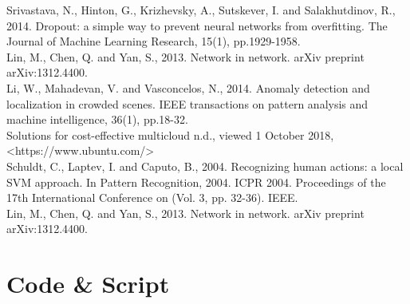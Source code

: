 \newline
[50] Srivastava, N., Hinton, G., Krizhevsky, A., Sutskever, I. and Salakhutdinov, R., 2014. Dropout: a simple way to prevent neural networks from overfitting. The Journal of Machine Learning Research, 15(1), pp.1929-1958.\\
\newline
[51] Lin, M., Chen, Q. and Yan, S., 2013. Network in network. arXiv preprint arXiv:1312.4400.\\
\newline
[52] Li, W., Mahadevan, V. and Vasconcelos, N., 2014. Anomaly detection and localization in crowded scenes. IEEE transactions on pattern analysis and machine intelligence, 36(1), pp.18-32.\\
\newline
[53] Solutions for cost-effective multicloud n.d., viewed 1 October 2018,\\ <https://www.ubuntu.com/> \\
\newline
[54] Schuldt, C., Laptev, I. and Caputo, B., 2004. Recognizing human actions: a local SVM approach. In Pattern Recognition, 2004. ICPR 2004. Proceedings of the 17th International Conference on (Vol. 3, pp. 32-36). IEEE.\\
\newline
[55] Lin, M., Chen, Q. and Yan, S., 2013. Network in network. arXiv preprint arXiv:1312.4400.

\section{Code \& Script}


	

	
